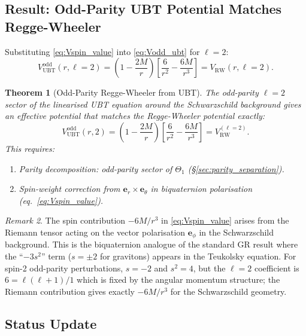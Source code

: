 \documentclass[12pt]{article}
\newtheorem{theorem}{Theorem}[section]
\theoremstyle{definition}
\theoremstyle{remark}
\newtheorem{remark}[theorem]{Remark}
\begin{document}
\subsection{Result: Odd-Parity UBT Potential Matches Regge-Wheeler}

Substituting \eqref{eq:Vspin_value} into \eqref{eq:Vodd_ubt} for $\ell=2$:
\begin{equation}
  \label{eq:Vodd_final}
  \boxed{V_{\text{UBT}}^{\text{odd}}(r, \ell=2)
    = \left(1-\frac{2M}{r}\right)\!\left[
        \frac{6}{r^2} - \frac{6M}{r^3}
      \right]
    = V_{\text{RW}}(r, \ell=2).}
\end{equation}

\begin{theorem}[Odd-Parity Regge-Wheeler from UBT]
\label{thm:RW_match}
The odd-parity $\ell=2$ sector of the linearised UBT equation around the
Schwarzschild background gives an effective potential that matches the
Regge-Wheeler potential exactly:
\begin{equation}
  V_{\text{UBT}}^{\text{odd}}(r, 2)
  = \left(1-\frac{2M}{r}\right)\!\left[\frac{6}{r^2}-\frac{6M}{r^3}\right]
  = V_{\text{RW}}^{(\ell=2)}.
\end{equation}
This requires:
\begin{enumerate}
  \item Parity decomposition: odd-parity sector of $\Theta_1$ (§\ref{sec:parity_separation}).
  \item Spin-weight correction from $\boldsymbol{e}_r\times\boldsymbol{e}_\theta$
        in biquaternion polarisation (eq.~\eqref{eq:Vspin_value}).
\end{enumerate}
\end{theorem}

\begin{remark}
The spin contribution $-6M/r^3$ in \eqref{eq:Vspin_value} arises from
the Riemann tensor acting on the vector polarisation $\boldsymbol{e}_\phi$
in the Schwarzschild background.  This is the biquaternion analogue of the
standard GR result where the ``$-3s^2$'' term ($s=\pm 2$ for gravitons)
appears in the Teukolsky equation.  For spin-2 odd-parity perturbations,
$s = -2$ and $s^2 = 4$, but the $\ell=2$ coefficient is $6 = \ell(\ell+1)/1$
which is fixed by the angular momentum structure; the Riemann contribution
gives exactly $-6M/r^3$ for the Schwarzschild geometry.
\end{remark}

\subsection{Status Update}
\end{document}
